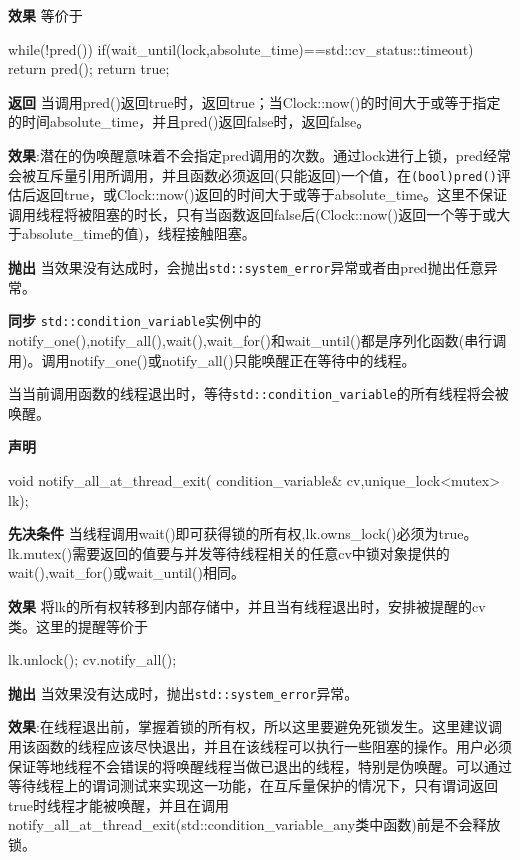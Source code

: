 \textbf{效果}
等价于

\begin{cpp}
while(!pred())
{
  if(wait_until(lock,absolute_time)==std::cv_status::timeout)
    return pred();
}
return true;
\end{cpp}

\textbf{返回}
当调用pred()返回true时，返回true；当Clock::now()的时间大于或等于指定的时间absolute\_time，并且pred()返回false时，返回false。

\textbf{效果}:潜在的伪唤醒意味着不会指定pred调用的次数。通过lock进行上锁，pred经常会被互斥量引用所调用，并且函数必须返回(只能返回)一个值，在\texttt{(bool)pred()}评估后返回true，或Clock::now()返回的时间大于或等于absolute\_time。这里不保证调用线程将被阻塞的时长，只有当函数返回false后(Clock::now()返回一个等于或大于absolute\_time的值)，线程接触阻塞。

\textbf{抛出}
当效果没有达成时，会抛出\texttt{std::system\_error}异常或者由pred抛出任意异常。

\textbf{同步}
\texttt{std::condition\_variable}实例中的notify\_one(),notify\_all(),wait(),wait\_for()和wait\_until()都是序列化函数(串行调用)。调用notify\_one()或notify\_all()只能唤醒正在等待中的线程。


当当前调用函数的线程退出时，等待\texttt{std::condition\_variable}的所有线程将会被唤醒。

\textbf{声明}

\begin{cpp}
void notify_all_at_thread_exit(
  condition_variable& cv,unique_lock<mutex> lk);
\end{cpp}

\textbf{先决条件}
当线程调用wait()即可获得锁的所有权,lk.owns\_lock()必须为true。lk.mutex()需要返回的值要与并发等待线程相关的任意cv中锁对象提供的wait(),wait\_for()或wait\_until()相同。

\textbf{效果}
将lk的所有权转移到内部存储中，并且当有线程退出时，安排被提醒的cv类。这里的提醒等价于

\begin{cpp}
lk.unlock();
cv.notify_all();
\end{cpp}

\textbf{抛出}
当效果没有达成时，抛出\texttt{std::system\_error}异常。

\textbf{效果}:在线程退出前，掌握着锁的所有权，所以这里要避免死锁发生。这里建议调用该函数的线程应该尽快退出，并且在该线程可以执行一些阻塞的操作。用户必须保证等地线程不会错误的将唤醒线程当做已退出的线程，特别是伪唤醒。可以通过等待线程上的谓词测试来实现这一功能，在互斥量保护的情况下，只有谓词返回true时线程才能被唤醒，并且在调用notify\_all\_at\_thread\_exit(std::condition\_variable\_any类中函数)前是不会释放锁。

